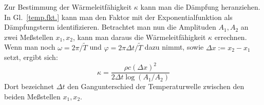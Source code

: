 Zur Bestimmung der Wärmeleitfähigkeit $\kappa$ kann man die Dämpfung
heranziehen. In Gl.~\eqref{temp.fkt.} kann man den Faktor mit der
Exponentialfunktion als Dämpfungsterm identifizieren. Betrachtet man nun
die Amplituden $A_1, A_2$ an zwei Meßstellen $x_1, x_2$, kann man daraus
die Wärmeleitfähigkeit $\kappa$ errechnen. Wenn man noch $\omega =
2\pi/\tilde{T}$ und $\varphi = 2\pi\Delta t/\tilde{T}$ dazu nimmt, sowie
$\Delta x := x_2-x_1$ setzt, ergibt sich:
%
\begin{equation}
  \label{eq:kappa-aus-daempfung}
  \kappa = \frac{\rho c(\Delta x)^2}{2\Delta t\log(A_1/A_2)}
\end{equation}
%
Dort bezeichnet $\Delta t$ den Gangunterschied der Temperaturwelle
zwischen den beiden Meßstellen $x_1, x_2$.

\nocite{v204}

